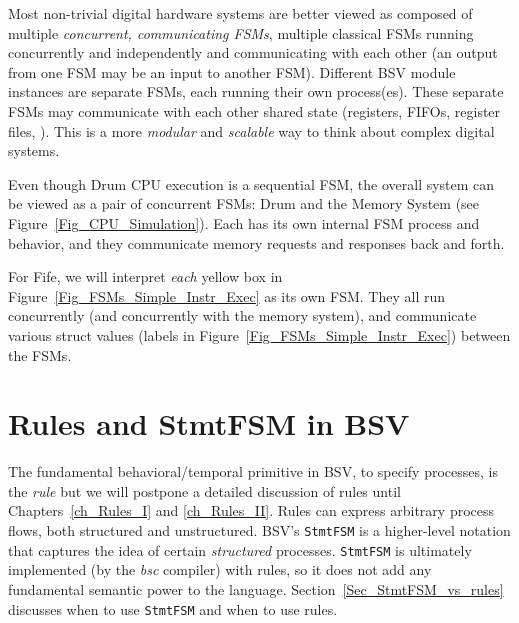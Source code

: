 Most non-trivial digital hardware systems are better viewed as
composed of multiple \emph{concurrent, communicating FSMs}, {\ie}
multiple classical FSMs running concurrently and independently and
communicating with each other (an output from one FSM may be an input
to another FSM).  Different BSV module instances are separate FSMs,
each running their own process(es).  These separate FSMs may
communicate with each other {\via} shared state (registers, FIFOs,
register files, {\etc}).  This is a more \emph{modular} and
\emph{scalable} way to think about complex digital systems.


Even though Drum CPU execution is a sequential FSM, the overall system
can be viewed as a pair of concurrent FSMs: Drum and the Memory System
(see Figure~\ref{Fig_CPU_Simulation}).  Each has its own internal FSM
process and behavior, and they communicate memory requests and
responses back and forth.


For Fife, we will interpret \emph{each} yellow box in
Figure~\ref{Fig_FSMs_Simple_Instr_Exec} as its own FSM.  They all run
concurrently (and concurrently with the memory system), and
communicate various struct values (labels in
Figure~\ref{Fig_FSMs_Simple_Instr_Exec}) between the FSMs.


\section{Rules and StmtFSM in BSV}

\label{Sec_Rules_StmtFSM}
\label{Sec_StmtFSM}


The fundamental behavioral/temporal primitive in BSV, to specify
processes, is the \emph{rule} but we will postpone a detailed
discussion of rules until Chapters~\ref{ch_Rules_I} and
\ref{ch_Rules_II}.  Rules can express arbitrary process flows, both
structured and unstructured.  BSV's \verb|StmtFSM| is a higher-level
notation that captures the idea of certain \emph{structured}
processes.  \verb|StmtFSM| is ultimately implemented (by the
\emph{bsc} compiler) with rules, so it does not add any fundamental
semantic power to the language.  Section~\ref{Sec_StmtFSM_vs_rules}
discusses when to use \verb|StmtFSM| and when to use rules.

